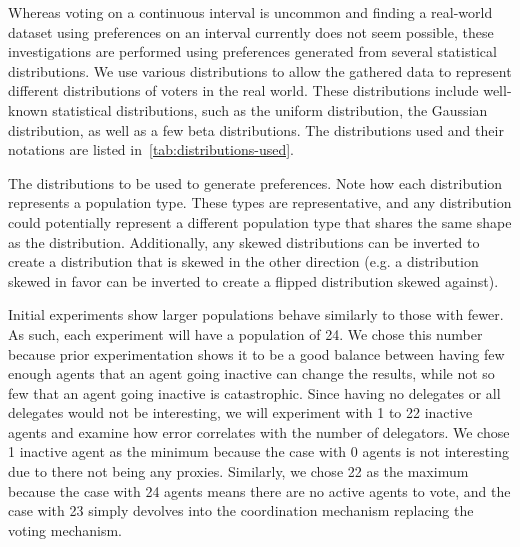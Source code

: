 Whereas voting on a continuous interval is uncommon and finding a real-world dataset
using preferences on an interval currently does not seem possible, these investigations
are performed using preferences generated from several statistical distributions.
We use various distributions to allow the gathered data to represent
different distributions of voters in the real world.
These distributions include well-known statistical distributions, such as the uniform
distribution, the Gaussian distribution, as well as a few beta distributions.
The distributions used and their notations are listed
in~\autoref{tab:distributions-used}.

\begin{table}[!htbp]
    \renewcommand{\arraystretch}{1.3}

    \caption{
        The distributions to be used to generate preferences.
        Note how each distribution represents a population type.
        These types are representative, and any distribution could potentially
        represent a different population type that shares the same shape as the
        distribution.
        Additionally, any skewed distributions can be inverted to create a
        distribution that is skewed in the other direction (e.g. a distribution
        skewed in favor can be inverted to create a flipped distribution skewed
        against).
    }
    \label{tab:distributions-used}

    \centering
    
\end{table}

Initial experiments show larger populations behave similarly to those with fewer.
As such, each experiment will have a population of 24.
We chose this number because prior experimentation shows it to be a good balance
between having few enough agents that an agent going inactive can change the
results, while not so few that an agent going inactive is catastrophic.
Since having no delegates or all delegates would not be interesting, we will
experiment with 1 to 22 inactive agents and examine how error correlates with
the number of delegators.
We chose 1 inactive agent as the minimum because the case with 0 agents is not
interesting due to there not being any proxies.
Similarly, we chose 22 as the maximum because the case with 24 agents means there are
no active agents to vote, and the case with 23 simply devolves into the coordination
mechanism replacing the voting mechanism.

